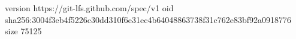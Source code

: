 version https://git-lfs.github.com/spec/v1
oid sha256:3004f3eb4f5226c30dd310f6e31ec4b64048863738f31c762e83bf92a0918776
size 75125
